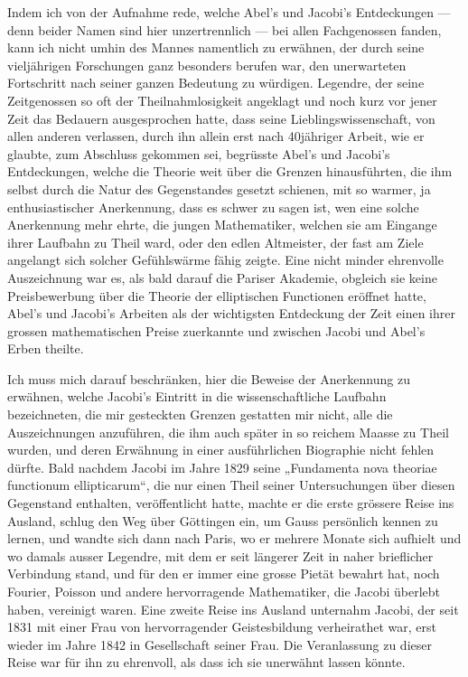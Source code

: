 \documentclass[11pt]{article}
\begin{document}
Indem ich von der Aufnahme rede, welche Abel’s und Jacobi’s Entdeckungen — denn beider Namen sind hier unzertrennlich — bei allen Fachgenossen fanden, kann ich nicht umhin des Mannes namentlich zu erwähnen, der durch seine vieljährigen Forschungen ganz besonders berufen war, den unerwarteten Fortschritt nach seiner ganzen Bedeutung zu würdigen. Legendre, der seine Zeitgenossen so oft der Theilnahmlosigkeit angeklagt und noch kurz vor jener Zeit das Bedauern ausgesprochen hatte, dass seine Lieblingswissenschaft, von allen anderen verlassen, durch ihn allein erst nach 40jähriger Arbeit, wie er glaubte, zum Abschluss gekommen sei, begrüsste Abel’s und Jacobi’s Entdeckungen, welche die Theorie weit über die Grenzen hinausführten, die ihm selbst durch die Natur des Gegenstandes gesetzt schienen, mit so warmer, ja enthusiastischer Anerkennung, dass es schwer zu sagen ist, wen eine solche Anerkennung mehr ehrte, die jungen Mathematiker, welchen sie am Eingange ihrer Laufbahn zu Theil ward, oder den edlen Altmeister, der fast am Ziele angelangt sich solcher Gefühlswärme fähig zeigte. Eine nicht minder ehrenvolle Auszeichnung war es, als bald darauf die Pariser Akademie, obgleich sie keine Preisbewerbung über die Theorie der elliptischen Functionen eröffnet hatte, Abel’s und Jacobi’s Arbeiten als der wichtigsten Entdeckung der Zeit einen ihrer grossen mathematischen Preise zuerkannte und zwischen Jacobi und Abel’s Erben theilte.

Ich muss mich darauf beschränken, hier die Beweise der Anerkennung zu erwähnen, welche Jacobi’s Eintritt in die wissenschaftliche Laufbahn bezeichneten, die mir gesteckten Grenzen gestatten mir nicht, alle die Auszeichnungen anzuführen, die ihm auch später in so reichem Maasse zu Theil wurden, und deren Erwähnung in einer ausführlichen Biographie nicht fehlen dürfte. Bald nachdem Jacobi im Jahre 1829 seine „Fundamenta nova theoriae functionum ellipticarum“, die nur einen Theil seiner Untersuchungen über diesen Gegenstand enthalten, veröffentlicht hatte, machte er die erste grössere Reise ins Ausland, schlug den Weg über Göttingen ein, um Gauss persönlich kennen zu lernen, und wandte sich dann nach Paris, wo er mehrere Monate sich aufhielt und wo damals ausser Legendre, mit dem er seit längerer Zeit in naher brieflicher Verbindung stand, und für den er immer eine grosse Pietät bewahrt hat, noch Fourier, Poisson und andere hervorragende Mathematiker, die Jacobi überlebt haben, vereinigt waren. Eine zweite Reise ins Ausland unternahm Jacobi, der seit 1831 mit einer Frau von hervorragender Geistesbildung verheirathet war, erst wieder im Jahre 1842 in Gesellschaft seiner Frau. Die Veranlassung zu dieser Reise war für ihn zu ehrenvoll, als dass ich sie unerwähnt lassen könnte.
\end{document}

